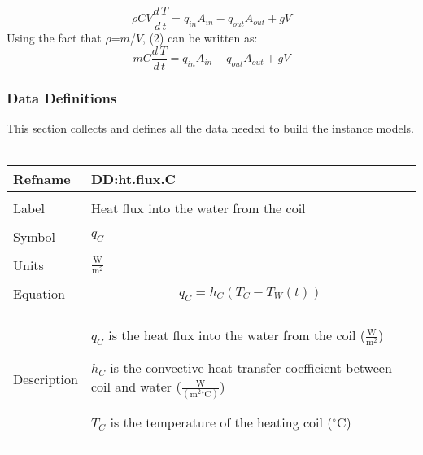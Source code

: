 \documentclass[12pt]{article}
\begin{document}
\begin{displaymath}
ρ C V \frac{d\,T}{d\,t}={q_{in}} {A_{in}}-{q_{out}} {A_{out}}+g V
\end{displaymath}
Using the fact that $ρ$=$m$/$V$, (2) can be written as:
\begin{displaymath}
m C \frac{d\,T}{d\,t}={q_{in}} {A_{in}}-{q_{out}} {A_{out}}+g V
\end{displaymath}
\subsubsection{Data Definitions}
\label{Sec:DDs}
This section collects and defines all the data needed to build the instance models.
~\newline
 \noindent \begin{minipage}{\textwidth}
\begin{tabular}{p{} p{}}
\toprule \textbf{Refname} & \textbf{DD:ht.flux.C}
\label{DD:ht.flux.C}
\\ \midrule \\
Label & Heat flux into the water from the coil
        \\ \midrule \\
        Symbol & ${q_{C}}$
                 \\ \midrule \\
                 Units & $\frac{\text{W}}{\text{m}^{2}}$
                         \\ \midrule \\
                         Equation & \begin{displaymath}
                                    {q_{C}}={h_{C}} \left({T_{C}}-{T_{W}}\left(t\right)\right)
                                    \end{displaymath}
                                    \\ \midrule \\
                                    Description & \begin{symbDescription}
                                                  \item{${q_{C}}$ is the heat flux into the water from the coil ($\frac{\text{W}}{\text{m}^{2}}$)}
                                                  \item{${h_{C}}$ is the convective heat transfer coefficient between coil and water ($\frac{\text{W}}{(\text{m}^{2}{}^{\circ}\text{C})}$)}
                                                  \item{${T_{C}}$ is the temperature of the heating coil (${}^{\circ}$C)}

\end{symbDescription}
\end{tabular}
\end{minipage}
\end{document}
